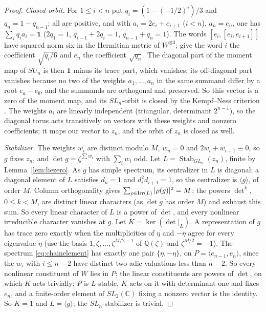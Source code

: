 \documentclass[11pt,a4paper]{article}
\theoremstyle{definition}
\newcommand{\C}{\mathbb{C}}
\newcommand{\Q}{\mathbb{Q}}
\newcommand{\one}{\mathbf{1}}
\newcommand{\Stab}{\operatorname{Stab}}
\begin{document}
\begin{proof}
\emph{Closed orbit.} For $1\le i<n$ put $q_i=(1-(-1/2)^i)/3$ and $q_n=1-q_{n-1}$;
all are positive, and with $a_i=2e_i+e_{i+1}$ ($i<n$), $a_n=e_n$, one has
$\sum_iq_ia_i=\one$ ($2q_1=1$, $q_{i-1}+2q_i=1$, $q_{n-1}+q_n=1$). The words
$[e_i,[e_i,e_{i+1}]]$ have squared norm six in the Hermitian metric of
$W^{\otimes3}$; give the word $i$ the coefficient $\sqrt{q_i/6}$ and $e_n$ the
coefficient $\sqrt{q_n}$. The diagonal part of the moment map of $SU_n$ is then
$\one$ minus its trace part, which vanishes; its off-diagonal part vanishes
because no two of the weights $a_1,\dots,a_n$ in the same summand differ by a
root $e_a-e_b$, and the summands are orthogonal and preserved. So this vector
is a zero of the moment map, and its $SL_n$-orbit is closed by the
Kempf--Ness criterion \cite[Theorem 4, p.~1]{Losev}. The weights $a_i$ are
linearly independent (triangular, determinant $2^{n-1}$), so the diagonal torus
acts transitively on vectors with these weights and nonzero coefficients; it
maps our vector to $z_n$, and the orbit of $z_n$ is closed as well.

\emph{Stabilizer.} The weights $w_i$ are distinct modulo $M$, $w_n=0$ and
$2w_i+w_{i+1}\equiv0$, so $g$ fixes $z_n$, and $\det g=\zeta^{\sum w_i}$ with
$\sum_iw_i$ odd. Let $L=\Stab_{GL_n}(z_n)$, finite by Lemma~\ref{lem:liezero}.
As $g$ has simple spectrum, its centralizer in $L$ is diagonal; a diagonal
element of $L$ satisfies $d_n=1$ and $d_i^2d_{i+1}=1$, so the centralizer is
$\langle g\rangle$, of order $M$. Column orthogonality gives
$\sum_{\rho\in{\rm Irr}(L)}|\rho(g)|^2=M$; the powers $\det^k$, $0\le k<M$, are
distinct linear characters (as $\det g$ has order $M$) and exhaust this sum. So
every linear character of $L$ is a power of $\det$, and every nonlinear
irreducible character vanishes at $g$. Let $K=\ker(\det|_L)$. A representation
of $g$ has trace zero exactly when the multiplicities of $\eta$ and $-\eta$
agree for every eigenvalue $\eta$ (use the basis $1,\zeta,\dots,\zeta^{M/2-1}$
of $\Q(\zeta)$ and $\zeta^{M/2}=-1$). The spectrum \eqref{eq:chainelement} has
exactly one pair $\{\eta,-\eta\}$, on $P=\langle e_{n-1},e_n\rangle$, since
the $w_i$ with $i\le n-2$ have distinct two-adic valuations less than $n-2$.
So every nonlinear constituent of $W$ lies in $P$; the linear constituents are
powers of $\det$, on which $K$ acts trivially; $P$ is $L$-stable, $K$ acts on
it with determinant one and fixes $e_n$, and a finite-order element of
$SL_2(\C)$ fixing a nonzero vector is the identity. So $K=1$ and
$L=\langle g\rangle$; the $SL_n$-stabilizer is trivial.


\end{proof}
\end{document}
